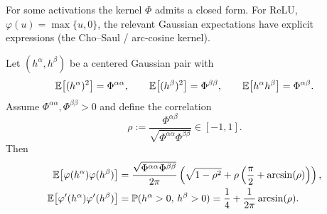 For some activations the kernel $\Phi$ admits a closed form. For ReLU, $\varphi(u) = \max\{u, 0\}$, the relevant Gaussian expectations have explicit expressions (the Cho--Saul / arc-cosine kernel).

\begin{proposition}\label{prop:ch2-cho-saul}
Let $(h^\alpha, h^\beta)$ be a centered Gaussian pair with
\begin{equation}\label{eq:ch2-cho-saul-cov}
\mathbb{E}\bigl[(h^\alpha)^2\bigr] = \Phi^{\alpha\alpha}, \qquad
\mathbb{E}\bigl[(h^\beta)^2\bigr] = \Phi^{\beta\beta}, \qquad
\mathbb{E}\bigl[h^\alpha h^\beta\bigr] = \Phi^{\alpha\beta}.
\end{equation}
Assume $\Phi^{\alpha\alpha}, \Phi^{\beta\beta} > 0$ and define the correlation
\begin{equation}\label{eq:ch2-cho-saul-rho}
\rho := \frac{\Phi^{\alpha\beta}}{\sqrt{\Phi^{\alpha\alpha}\Phi^{\beta\beta}}} \in [-1, 1].
\end{equation}
Then
\begin{align}
\mathbb{E}\bigl[\varphi(h^\alpha)\varphi(h^\beta)\bigr] &= \frac{\sqrt{\Phi^{\alpha\alpha}\Phi^{\beta\beta}}}{2\pi}\left( \sqrt{1 - \rho^2} + \rho\left(\frac{\pi}{2} + \arcsin(\rho)\right) \right), \label{eq:ch2-cho-saul-fwd} \\
\mathbb{E}\bigl[\varphi'(h^\alpha)\varphi'(h^\beta)\bigr] &= \mathbb{P}(h^\alpha > 0,\, h^\beta > 0) = \frac{1}{4} + \frac{1}{2\pi}\arcsin(\rho). \label{eq:ch2-cho-saul-deriv}
\end{align}
\end{proposition}

